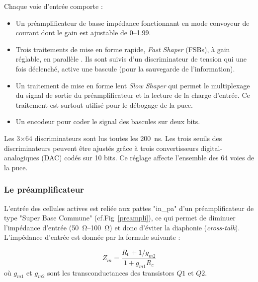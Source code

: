 Chaque voie d'entrée comporte :
\begin{itemize}[label=$\bullet$]
	\item Un préamplificateur de basse impédance fonctionnant en mode convoyeur de courant dont le gain est ajustable de \SIrange{0}{1.99}{}.
	\item Trois traitements de mise en forme rapide, \textit{Fast Shaper} (FSBs), à gain réglable, en parallèle . Ils sont suivis d'un discriminateur de tension qui une fois déclenché, active une bascule (pour la sauvegarde de l'information).
	\item Un traitement de mise en forme lent \textit{Slow Shaper} qui permet le multiplexage du signal de sortie du préamplificateur et la lecture de la charge d'entrée. Ce traitement est surtout utilisé pour le débogage de la puce.
	\item Un encodeur pour coder le signal des bascules sur deux bits.
\end{itemize}

Les \num{3}$\times$\num{64} discriminateurs sont lus toutes les \SI{200}{\nano\second}. Les trois seuils des discriminateurs peuvent être ajustés grâce à trois convertisseurs digital-analogiques (DAC) codés sur \num{10} bits. Ce réglage affecte l'ensemble des \num{64} voies de la puce.

\subsubsection{Le préamplificateur}
L'entrée des cellules actives est reliée aux pattes "in\_pa" d'un préamplificateur de type "Super Base Commune" (cf.Fig~\ref{preampli}), ce qui permet de diminuer l'impédance d'entrée (\SIrange{50}{100}{\ohm}) et donc d'éviter la diaphonie (\textit{cross-talk}). L'impédance d'entrée est donnée par la formule suivante :

\begin{equation}
Z_{in}=\frac{R_0+1/g_{m2}}{1+g_{m1}R_c}
\end{equation}
où $g_{m1}$ et $g_{m2}$ sont les transconductances des transistors $Q1$ et $Q2$.

